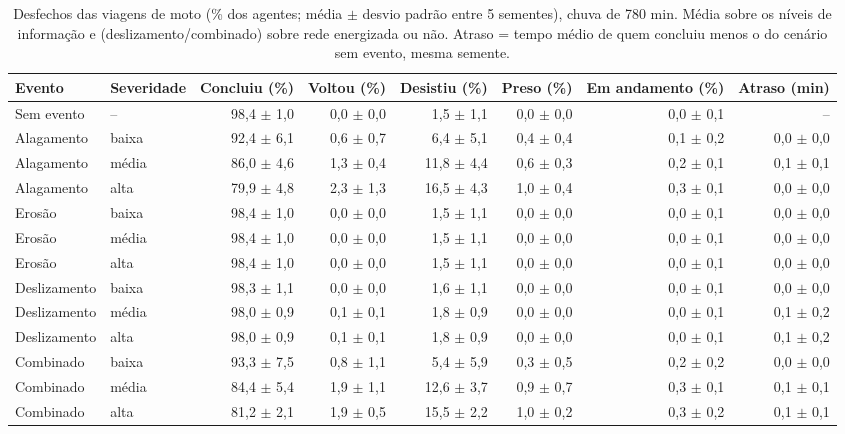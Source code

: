 \begin{table}[htbp]
\centering
\scriptsize
\caption{Desfechos das viagens de moto (\% dos agentes; média $\pm$ desvio padrão entre 5 sementes), chuva de 780 min. Média sobre os níveis de informação e (deslizamento/combinado) sobre rede energizada ou não. Atraso = tempo médio de quem concluiu menos o do cenário sem evento, mesma semente.}
\label{tab:t1_780_moto}
\begin{tabular}{llrrrrrr}
\toprule
Evento & Severidade & Concluiu (\%) & Voltou (\%) & Desistiu (\%) & Preso (\%) & Em andamento (\%) & Atraso (min) \\
\midrule
Sem evento & -- & 98,4 $\pm$ 1,0 & 0,0 $\pm$ 0,0 & 1,5 $\pm$ 1,1 & 0,0 $\pm$ 0,0 & 0,0 $\pm$ 0,1 & -- \\
Alagamento & baixa & 92,4 $\pm$ 6,1 & 0,6 $\pm$ 0,7 & 6,4 $\pm$ 5,1 & 0,4 $\pm$ 0,4 & 0,1 $\pm$ 0,2 & 0,0 $\pm$ 0,0 \\
Alagamento & média & 86,0 $\pm$ 4,6 & 1,3 $\pm$ 0,4 & 11,8 $\pm$ 4,4 & 0,6 $\pm$ 0,3 & 0,2 $\pm$ 0,1 & 0,1 $\pm$ 0,1 \\
Alagamento & alta & 79,9 $\pm$ 4,8 & 2,3 $\pm$ 1,3 & 16,5 $\pm$ 4,3 & 1,0 $\pm$ 0,4 & 0,3 $\pm$ 0,1 & 0,0 $\pm$ 0,0 \\
Erosão & baixa & 98,4 $\pm$ 1,0 & 0,0 $\pm$ 0,0 & 1,5 $\pm$ 1,1 & 0,0 $\pm$ 0,0 & 0,0 $\pm$ 0,1 & 0,0 $\pm$ 0,0 \\
Erosão & média & 98,4 $\pm$ 1,0 & 0,0 $\pm$ 0,0 & 1,5 $\pm$ 1,1 & 0,0 $\pm$ 0,0 & 0,0 $\pm$ 0,1 & 0,0 $\pm$ 0,0 \\
Erosão & alta & 98,4 $\pm$ 1,0 & 0,0 $\pm$ 0,0 & 1,5 $\pm$ 1,1 & 0,0 $\pm$ 0,0 & 0,0 $\pm$ 0,1 & 0,0 $\pm$ 0,0 \\
Deslizamento & baixa & 98,3 $\pm$ 1,1 & 0,0 $\pm$ 0,0 & 1,6 $\pm$ 1,1 & 0,0 $\pm$ 0,0 & 0,0 $\pm$ 0,1 & 0,0 $\pm$ 0,0 \\
Deslizamento & média & 98,0 $\pm$ 0,9 & 0,1 $\pm$ 0,1 & 1,8 $\pm$ 0,9 & 0,0 $\pm$ 0,0 & 0,0 $\pm$ 0,1 & 0,1 $\pm$ 0,2 \\
Deslizamento & alta & 98,0 $\pm$ 0,9 & 0,1 $\pm$ 0,1 & 1,8 $\pm$ 0,9 & 0,0 $\pm$ 0,0 & 0,0 $\pm$ 0,1 & 0,1 $\pm$ 0,2 \\
Combinado & baixa & 93,3 $\pm$ 7,5 & 0,8 $\pm$ 1,1 & 5,4 $\pm$ 5,9 & 0,3 $\pm$ 0,5 & 0,2 $\pm$ 0,2 & 0,0 $\pm$ 0,0 \\
Combinado & média & 84,4 $\pm$ 5,4 & 1,9 $\pm$ 1,1 & 12,6 $\pm$ 3,7 & 0,9 $\pm$ 0,7 & 0,3 $\pm$ 0,1 & 0,1 $\pm$ 0,1 \\
Combinado & alta & 81,2 $\pm$ 2,1 & 1,9 $\pm$ 0,5 & 15,5 $\pm$ 2,2 & 1,0 $\pm$ 0,2 & 0,3 $\pm$ 0,2 & 0,1 $\pm$ 0,1 \\
\bottomrule
\end{tabular}
\end{table}
